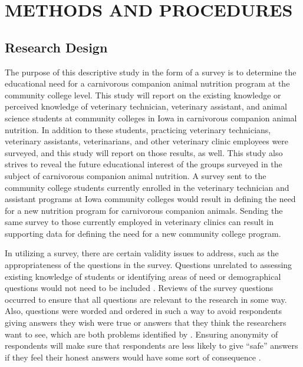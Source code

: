 
\chapter{METHODS AND PROCEDURES}

\section{Research Design}

The purpose of this descriptive study in the form of a survey is to determine the educational need for a carnivorous companion animal nutrition program at the community college level.  This study will report on the existing knowledge or perceived knowledge of veterinary technician, veterinary assistant, and animal science students at community colleges in Iowa in carnivorous companion animal nutrition. In addition to these students, practicing veterinary technicians, veterinary assistants, veterinarians, and other veterinary clinic employees were surveyed, and this study will report on those results, as well. This study also strives to reveal the future educational interest of the groups surveyed in the subject of carnivorous companion animal nutrition.  A survey sent to the community college students currently enrolled in the veterinary technician and assistant programs at Iowa community colleges would result in defining the need for a new nutrition program for carnivorous companion animals. Sending the same survey to those currently employed in veterinary clinics can result in supporting data for defining the need for a new community college program.
\par In utilizing a survey, there are certain validity issues to address, such as the appropriateness of the questions in the survey.  Questions unrelated to assessing existing knowledge of students or identifying areas of need or demographical questions would not need to be included \citep{ary}.  Reviews of the survey questions occurred to ensure that all questions are relevant to the research in some way.  Also, questions were worded and ordered in such a way to avoid respondents giving answers they wish were true or answers that they think the researchers want to see, which are both problems identified by \cite{ary}.  Ensuring anonymity of respondents will make sure that respondents are less likely to give “safe” answers if they feel their honest answers would have some sort of consequence \citep{ary}.



